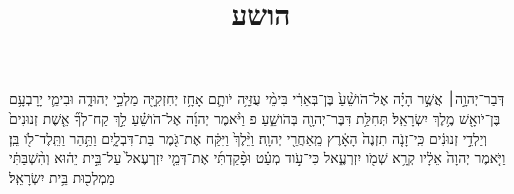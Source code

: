 \documentclass{openreader}
\title{הושע}
\date{}
\begin{document}
\maketitle
\raggedbottom 
\fontsize{16pt}{24pt}\selectfont


דְּבַר־יְהוָ֣ה׀ אֲשֶׁ֣ר הָיָ֗ה אֶל־הֹושֵׁ֨עַ֙ בֶּן־בְּאֵרִ֔י בִּימֵ֨י עֻזִּיָּ֥ה יֹותָ֛ם אָחָ֥ז יְחִזְקִיָּ֖ה מַלְכֵ֣י יְהוּדָ֑ה וּבִימֵ֛י יָרָבְעָ֥ם בֶּן־יֹואָ֖שׁ מֶ֥לֶךְ יִשְׂרָאֵֽל׃ 
תְּחִלַּ֥ת דִּבֶּר־יְהוָ֖ה בְּהֹושֵׁ֑עַ פ וַיֹּ֨אמֶר יְהוָ֜ה אֶל־הֹושֵׁ֗עַ לֵ֣ךְ קַח־לְךָ֞ אֵ֤שֶׁת זְנוּנִים֙ וְיַלְדֵ֣י זְנוּנִ֔ים כִּֽי־זָנֹ֤ה תִזְנֶה֙ הָאָ֔רֶץ מֵֽאַחֲרֵ֖י יְהוָֽה׃ 
וַיֵּ֨לֶךְ֙ וַיִּקַּ֔ח אֶת־גֹּ֖מֶר בַּת־דִּבְלָ֑יִם וַתַּ֥הַר וַתֵּֽלֶד־לֹ֖ו בֵּֽן׃ 
וַיֹּ֤אמֶר יְהוָה֙ אֵלָ֔יו קְרָ֥א שְׁמֹ֖ו יִזְרְעֶ֑אל כִּי־עֹ֣וד מְעַ֗ט וּפָ֨קַדְתִּ֜י אֶת־דְּמֵ֤י יִזְרְעֶאל֙ עַל־בֵּ֣ית יֵה֔וּא וְהִ֨שְׁבַּתִּ֔י מַמְלְכ֖וּת בֵּ֥ית יִשְׂרָאֵֽל׃ 
\end{document}
